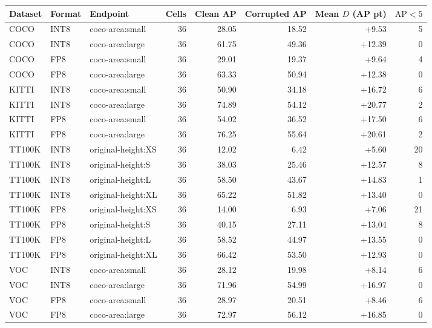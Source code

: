 \begin{tabular}{lllrrrrr}
\toprule
Dataset & Format & Endpoint & Cells & Clean AP & Corrupted AP & Mean $D$ (AP pt) & $\mathrm{AP}<5$ \\
\midrule
COCO & INT8 & coco-area:small & 36 & 28.05 & 18.52 & +9.53 & 5 \\
COCO & INT8 & coco-area:large & 36 & 61.75 & 49.36 & +12.39 & 0 \\
COCO & FP8 & coco-area:small & 36 & 29.01 & 19.37 & +9.64 & 4 \\
COCO & FP8 & coco-area:large & 36 & 63.33 & 50.94 & +12.38 & 0 \\
KITTI & INT8 & coco-area:small & 36 & 50.90 & 34.18 & +16.72 & 6 \\
KITTI & INT8 & coco-area:large & 36 & 74.89 & 54.12 & +20.77 & 2 \\
KITTI & FP8 & coco-area:small & 36 & 54.02 & 36.52 & +17.50 & 6 \\
KITTI & FP8 & coco-area:large & 36 & 76.25 & 55.64 & +20.61 & 2 \\
TT100K & INT8 & original-height:XS & 36 & 12.02 & 6.42 & +5.60 & 20 \\
TT100K & INT8 & original-height:S & 36 & 38.03 & 25.46 & +12.57 & 8 \\
TT100K & INT8 & original-height:L & 36 & 58.50 & 43.67 & +14.83 & 1 \\
TT100K & INT8 & original-height:XL & 36 & 65.22 & 51.82 & +13.40 & 0 \\
TT100K & FP8 & original-height:XS & 36 & 14.00 & 6.93 & +7.06 & 21 \\
TT100K & FP8 & original-height:S & 36 & 40.15 & 27.11 & +13.04 & 8 \\
TT100K & FP8 & original-height:L & 36 & 58.52 & 44.97 & +13.55 & 0 \\
TT100K & FP8 & original-height:XL & 36 & 66.42 & 53.50 & +12.93 & 0 \\
VOC & INT8 & coco-area:small & 36 & 28.12 & 19.98 & +8.14 & 6 \\
VOC & INT8 & coco-area:large & 36 & 71.96 & 54.99 & +16.97 & 0 \\
VOC & FP8 & coco-area:small & 36 & 28.97 & 20.51 & +8.46 & 6 \\
VOC & FP8 & coco-area:large & 36 & 72.97 & 56.12 & +16.85 & 0 \\
\bottomrule
\end{tabular}
